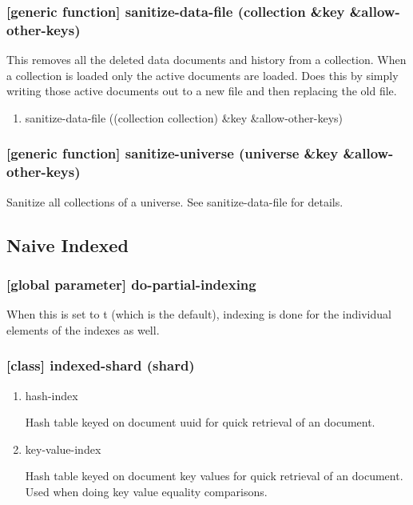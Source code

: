 \documentclass[11pt]{article}
\begin{document}
\subsubsection{[generic function] sanitize-data-file (collection \&key \&allow-other-keys)}
\label{sec:org620294b}

This removes all the deleted data documents and history from a
collection. When a collection is loaded only the active documents are
loaded. Does this by simply writing those active documents out to a
new file and then replacing the old file.

\begin{enumerate}
\item sanitize-data-file ((collection collection) \&key \&allow-other-keys)
\label{sec:orgadfc5ad}
\end{enumerate}

\subsubsection{[generic function] sanitize-universe (universe \&key \&allow-other-keys)}
\label{sec:org4769ec3}

Sanitize all collections of a universe. See sanitize-data-file for details.

\subsection{Naive Indexed}
\label{sec:org76f4a73}

\subsubsection{[global parameter] \textbf{do-partial-indexing}}
\label{sec:org70a93ef}

When this is set to t (which is the default), indexing is done for the
individual elements of the indexes as well.

\subsubsection{[class] indexed-shard (shard)}
\label{sec:org5dd8d4c}

\begin{enumerate}
\item\relax [accessor] hash-index
\label{sec:orgc901d27}

Hash table keyed on document uuid for quick retrieval of an document.

\item\relax [accessor] key-value-index
\label{sec:orgd619c6e}

Hash table keyed on document key values for quick retrieval of an document.
Used when doing key value equality comparisons.
\end{enumerate}
\end{document}
